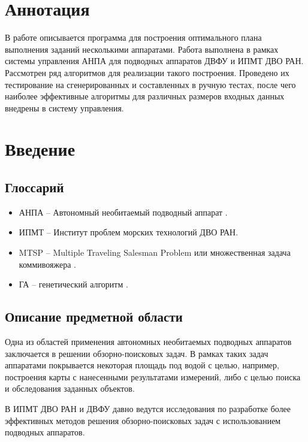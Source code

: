\documentclass[a4paper,14pt,russian]{article}
\begin{document}
\tableofcontents
\newpage

\section*{Аннотация}

В работе описывается программа для построения оптимального плана выполнения заданий несколькими аппаратами. Работа выполнена в рамках системы управления АНПА для подводных аппаратов ДВФУ и ИПМТ ДВО РАН. Рассмотрен ряд алгоритмов для реализации такого построения. Проведено их тестирование на сгенерированных и составленных в ручную тестах, после чего наиболее эффективные алгоритмы для различных размеров входных данных внедрены в систему управления.

\section{Введение}
\subsection{Глоссарий}
\begin{itemize}
\item АНПА -- Автономный необитаемый подводный аппарат \cite{auv}.
\item ИПМТ -- Институт проблем морских технологий ДВО РАН.
\item MTSP -- Multiple Traveling Salesman Problem или множественная задача коммивояжера \cite{bektas2006multiple}.
\item ГА -- генетический алгоритм \cite{ga}.
\end{itemize}

\subsection{Описание предметной области}


Одна из областей применения автономных необитаемых подводных аппаратов заключается в решении обзорно-поисковых задач. В рамках таких задач аппаратами покрывается некоторая площадь под водой с целью, например, построения карты с нанесенными результатами измерений, либо с целью поиска и обследования заданных объектов.

В ИПМТ ДВО РАН и ДВФУ давно ведутся исследования по разработке более эффективных методов решения обзорно-поисковых задач с использованием подводных аппаратов.
\end{document}
